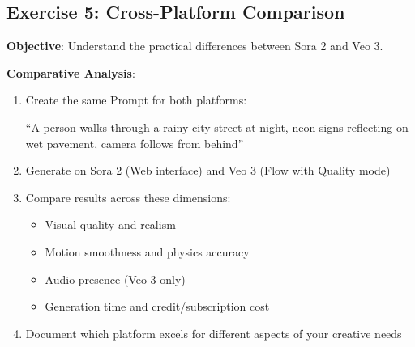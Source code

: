 \subsection*{Exercise 5: Cross-Platform Comparison}
\textbf{Objective}: Understand the practical differences between Sora 2 and Veo 3.

\textbf{Comparative Analysis}:
\begin{enumerate}
\item Create the same Prompt for both platforms:
\begin{Prompt}
``A person walks through a rainy city street at night, neon signs reflecting on wet pavement, camera follows from behind''
\end{Prompt}
\item Generate on Sora 2 (Web interface) and Veo 3 (Flow with Quality mode)
\item Compare results across these dimensions:
  \begin{itemize}
  \item Visual quality and realism
  \item Motion smoothness and physics accuracy
  \item Audio presence (Veo 3 only)
  \item Generation time and credit/subscription cost
  \end{itemize}
\item Document which platform excels for different aspects of your creative needs
\end{enumerate}
